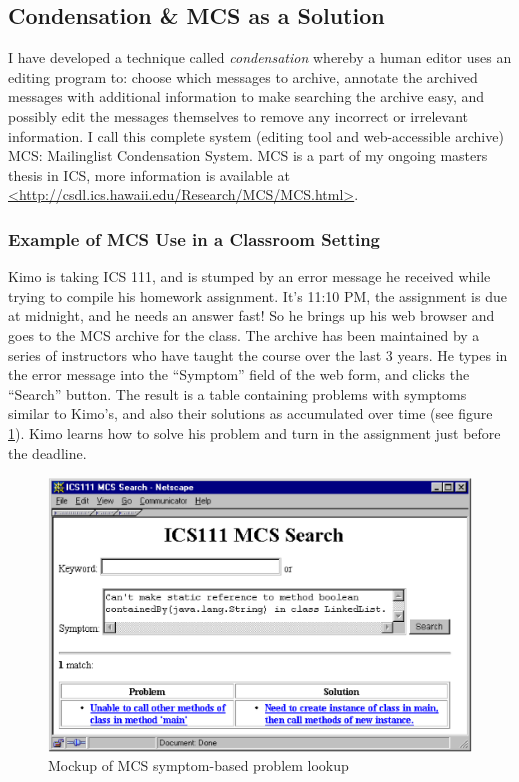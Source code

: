 \subsection{Condensation \& MCS as a Solution}
I have developed a technique called {\em condensation} whereby a human editor
uses an editing program to: choose which messages to archive, annotate the
archived messages with additional information to make searching the archive
easy, and possibly edit the messages themselves to remove any incorrect or
irrelevant information. I call this complete system (editing tool and
web-accessible archive) MCS: Mailinglist Condensation System. MCS is a part of
my ongoing masters thesis in ICS, more information is available at
\url{<http://csdl.ics.hawaii.edu/Research/MCS/MCS.html>}.

\subsubsection{Example of MCS Use in a Classroom Setting}
Kimo is taking ICS 111, and is stumped by an error message he received while
trying to compile his homework assignment. It's 11:10 PM, the assignment is due
at midnight, and he needs an answer fast! So he brings up his web browser and
goes to the MCS archive for the class. The archive has been maintained by a
series of instructors who have taught the course over the last 3 years. He
types in the error message into the ``Symptom'' field of the web form, and
clicks the ``Search'' button. The result is a table containing problems with
symptoms similar to Kimo's, and also their solutions as accumulated over time
(see figure \ref{fig:mcs-screenshot}). Kimo learns how to solve his problem and
turn in the assignment just before the deadline.

\begin{figure}[htb]
  \centering
  \includegraphics{mcs-screenshot.eps}
  \caption{Mockup of MCS symptom-based problem lookup}
  \label{fig:mcs-screenshot}
\end{figure}

